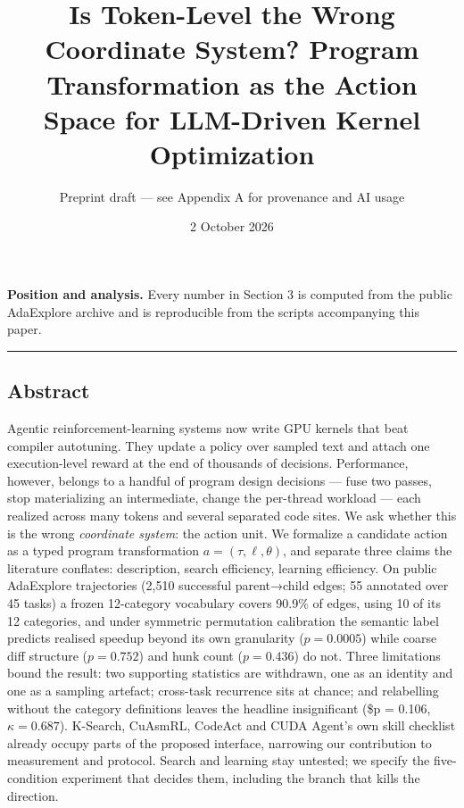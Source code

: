 \documentclass[
  11pt,
]{article}
\title{Is Token-Level the Wrong Coordinate System? Program Transformation as the Action Space for LLM-Driven Kernel Optimization}
\author{Preprint draft --- see Appendix A for provenance and AI usage}
\date{2 October 2026}
\begin{document}
\maketitle

\textbf{Position and analysis.} Every number in Section 3 is computed from the public AdaExplore archive and is reproducible from the scripts accompanying this paper.

\begin{center}\rule{0.5\linewidth}{0.5pt}\end{center}

\hypertarget{abstract}{%
\subsection{Abstract}\label{abstract}}

Agentic reinforcement-learning systems now write GPU kernels that beat compiler autotuning. They update a policy over sampled text and attach one execution-level reward at the end of thousands of decisions. Performance, however, belongs to a handful of program design decisions --- fuse two passes, stop materializing an intermediate, change the per-thread workload --- each realized across many tokens and several separated code sites. We ask whether this is the wrong \emph{coordinate system}: the action unit. We formalize a candidate action as a typed program transformation \(a = (\tau, \ell, \theta)\), and separate three claims the literature conflates: description, search efficiency, learning efficiency. On public AdaExplore trajectories (2,510 successful parent→child edges; 55 annotated over 45 tasks) a frozen 12-category vocabulary covers 90.9\% of edges, using 10 of its 12 categories, and under symmetric permutation calibration the semantic label predicts realised speedup beyond its own granularity (\(p = 0.0005\)) while coarse diff structure (\(p = 0.752\)) and hunk count (\(p = 0.436\)) do not. Three limitations bound the result: two supporting statistics are withdrawn, one as an identity and one as a sampling artefact; cross-task recurrence sits at chance; and relabelling without the category definitions leaves the headline insignificant (\$p = 0.106, \(\kappa = 0.687\)). K-Search, CuAsmRL, CodeAct and CUDA Agent's own skill checklist already occupy parts of the proposed interface, narrowing our contribution to measurement and protocol. Search and learning stay untested; we specify the five-condition experiment that decides them, including the branch that kills the direction.
\end{document}
